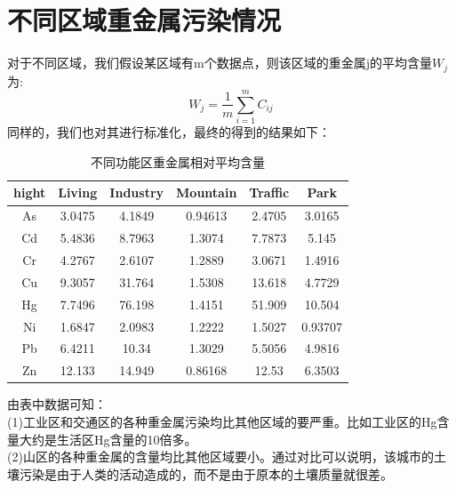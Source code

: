 \documentclass[a4paper]{article}
\begin{document}
\section{不同区域重金属污染情况}
对于不同区域，我们假设某区域有m个数据点，则该区域的重金属j的平均含量$W_j$为:
\begin{equation}
W_j=\frac{1}{m}\sum_{i=1}^m C_{ij}
\end{equation}
\indent 同样的，我们也对其进行标准化，最终的得到的结果如下：
\begin{table}[H]
		\centering
		\caption{不同功能区重金属相对平均含量}
		\label{average-contend}
		\begin{tabular}{c|ccccc}
			hight	  &    Living  &  Industry  &  Mountain  &  Traffic  &   Park    \\
			\hline
			As   & 3.0475  &  4.1849   &   0.94613   &  2.4705   &   3.0165      \\
    			Cd   & 5.4836  &  8.7963   &    1.3074   &  7.7873   &    5.145		\\
    			Cr   & 4.2767  &  2.6107   &    1.2889   &  3.0671   &   1.4916		\\
    			Cu   & 9.3057  &  31.764   &    1.5308   &  13.618   &   4.7729		\\
    			Hg   & 7.7496  &  76.198   &    1.4151   &  51.909   &   10.504		\\
    			Ni   & 1.6847  &  2.0983   &    1.2222   &  1.5027   &  0.93707		\\
    			Pb   & 6.4211  &   10.34   &    1.3029   &  5.5056   &   4.9816		\\
    			Zn   & 12.133  &  14.949   &   0.86168   &   12.53   &   6.3503		\\
		\end{tabular}
	\end{table}
由表中数据可知： \\
\indent (1)工业区和交通区的各种重金属污染均比其他区域的要严重。比如工业区的Hg含量大约是生活区Hg含量的10倍多。                                \\
\indent (2)山区的各种重金属的含量均比其他区域要小。通过对比可以说明，该城市的土壤污染是由于人类的活动造成的，而不是由于原本的土壤质量就很差。     \\
\end{document}
